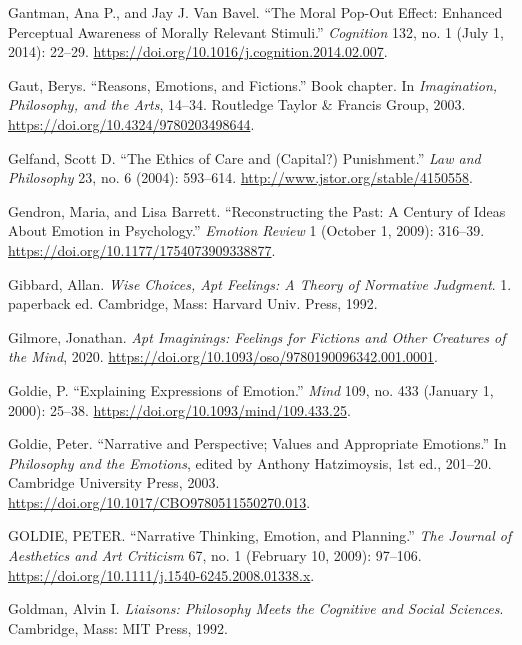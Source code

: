 \documentclass[
  12pt,
]{book}
\newlength{\cslhangindent}
\newenvironment{CSLReferences}[2] %
 {\begin{list}{}{%
  \setlength{\itemindent}{0pt}
  \setlength{\leftmargin}{0pt}
  \setlength{\parsep}{0pt}
  \ifodd #1
   \setlength{\leftmargin}{\cslhangindent}
   \setlength{\itemindent}{-1\cslhangindent}
  \fi
  \setlength{\itemsep}{#2\baselineskip}}}
 {\end{list}}
\theoremstyle{definition}
\theoremstyle{definition}
\theoremstyle{definition}
\theoremstyle{definition}
\theoremstyle{remark}
\begin{document}
\begin{CSLReferences}{1}{0}
Gantman, Ana P., and Jay J. Van Bavel. {``The Moral Pop-Out Effect: {Enhanced} Perceptual Awareness of Morally Relevant Stimuli.''} \emph{Cognition} 132, no. 1 (July 1, 2014): 22--29. \url{https://doi.org/10.1016/j.cognition.2014.02.007}.

Gaut, Berys. {``Reasons, Emotions, and Fictions.''} Book chapter. In \emph{Imagination, {Philosophy}, and the {Arts}}, 14--34. Routledge Taylor \& Francis Group, 2003. \url{https://doi.org/10.4324/9780203498644}.

Gelfand, Scott D. {``The {Ethics} of {Care} and ({Capital}?) {Punishment}.''} \emph{Law and Philosophy} 23, no. 6 (2004): 593--614. \url{http://www.jstor.org/stable/4150558}.

Gendron, Maria, and Lisa Barrett. {``Reconstructing the {Past}: {A Century} of {Ideas About Emotion} in {Psychology}.''} \emph{Emotion Review} 1 (October 1, 2009): 316--39. \url{https://doi.org/10.1177/1754073909338877}.

Gibbard, Allan. \emph{Wise Choices, Apt Feelings: A Theory of Normative Judgment}. 1. paperback ed. Cambridge, Mass: Harvard Univ. Press, 1992.

Gilmore, Jonathan. \emph{Apt {Imaginings}: {Feelings} for {Fictions} and {Other Creatures} of the {Mind}}, 2020. \url{https://doi.org/10.1093/oso/9780190096342.001.0001}.

Goldie, P. {``Explaining Expressions of Emotion.''} \emph{Mind} 109, no. 433 (January 1, 2000): 25--38. \url{https://doi.org/10.1093/mind/109.433.25}.

Goldie, Peter. {``Narrative and {Perspective}; {Values} and {Appropriate Emotions}.''} In \emph{Philosophy and the {Emotions}}, edited by Anthony Hatzimoysis, 1st ed., 201--20. Cambridge University Press, 2003. \url{https://doi.org/10.1017/CBO9780511550270.013}.

GOLDIE, PETER. {``Narrative {Thinking}, {Emotion}, and {Planning}.''} \emph{The Journal of Aesthetics and Art Criticism} 67, no. 1 (February 10, 2009): 97--106. \url{https://doi.org/10.1111/j.1540-6245.2008.01338.x}.

Goldman, Alvin I. \emph{Liaisons: Philosophy Meets the Cognitive and Social Sciences}. Cambridge, Mass: MIT Press, 1992.


\end{CSLReferences}
\end{document}
